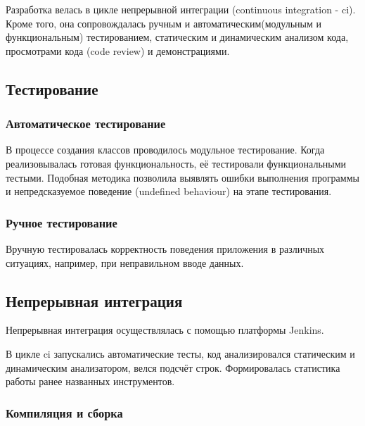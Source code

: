 Разработка велась в цикле непрерывной интеграции (continuous integration - ci). Кроме того, она сопровождалась ручным и автоматическим(модульным и функциональным) тестированием, статическим и динамическим анализом кода, просмотрами кода (code review) и демонстрациями.

\subsection*{Тестирование}

\subsubsection*{Автоматическое тестирование}

В процессе создания классов проводилось модульное тестирование. Когда реализовывалась готовая функциональность, её тестировали функциональными тестыми. Подобная методика позволила выявлять ошибки выполнения программы и непредсказуемое поведение (undefined behaviour) на этапе тестирования.

\subsubsection*{Ручное тестирование}

Вручную тестировалась корректность поведения приложения в различных ситуациях, например, при неправильном вводе данных.

\subsection*{Непрерывная интеграция}

Непрерывная интеграция осуществлялась с помощью платформы Jenkins.
	
В цикле ci запускались автоматические тесты, код анализировался статическим и динамическим анализатором, велся подсчёт строк. Формировалась статистика работы ранее названных инструментов.

\subsubsection*{Компиляция и сборка}

